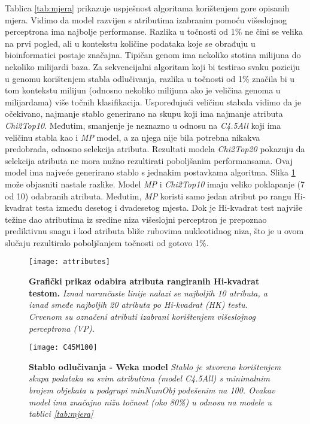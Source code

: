 Tablica \ref{tab:mjera} prikazuje uspješnost algoritama korištenjem gore opisanih mjera. Vidimo da model razvijen s atributima izabranim pomoću višeslojnog perceptrona ima najbolje performanse. Razlika u točnosti od 1\% ne čini se velika na prvi pogled, ali u kontekstu količine podataka koje se obrađuju u bioinformatici postaje značajna. Tipičan genom ima nekoliko stotina milijuna do nekoliko milijardi baza. Za sekvencijalni algoritam koji bi testirao svaku poziciju u genomu korištenjem stabla odlučivanja, razlika u točnosti od 1\% značila bi u tom kontekstu milijun (odnosno nekoliko milijuna ako je veličina genoma u milijardama) više točnih klasifikacija.
Uspoređujući veličinu stabala vidimo da je očekivano, najmanje stablo generirano na skupu koji ima najmanje atributa \textit{Chi2Top10}. Međutim, smanjenje je neznazno u odnosu na \textit{C4.5All} koji ima veličinu stabla kao i \textit{MP} model, a za njega nije bila potrebna nikakva predobrada, odnosno selekcija atributa. 
Rezultati modela \textit{Chi2Top20} pokazuju da selekcija atributa ne mora nužno rezultirati poboljšanim performansama. Ovaj model ima najveće generirano stablo s jednakim postavkama algoritma. Slika \ref{fig:attributes} može objasniti nastale razlike. Model \textit{MP} i \textit{Chi2Top10} imaju veliko poklapanje (7 od 10) odabranih atributa. Međutim, \textit{MP} koristi samo jedan atribut po rangu Hi-kvadrat testa između desetog i dvadesetog mjesta. Dok je Hi-kvadrat test najviše težine dao atributima iz sredine niza višeslojni perceptron je prepoznao prediktivnu snagu i kod atributa bliže rubovima nukleotidnog niza, što je u ovom slučaju rezultiralo poboljšanjem točnosti od gotovo 1\%.
\begin{figure}[!ht]
    \centering
    \texttt{[image: attributes]}
    \caption[Grafički prikaz odabira atributa]{\textbf{Grafički prikaz odabira atributa rangiranih Hi-kvadrat testom.}  \textit{Iznad narančaste linije nalazi se najboljih 10 atributa, a iznad smeđe najboljih 20 atributa po Hi-kvadrat (HK) testu. Crvenom su označeni atributi izabrani korištenjem višeslojnog perceptrona (VP).}}
    \label{fig:attributes}
\end{figure}
\begin{figure}[!ht]
    \centering
    \texttt{[image: C45M100]}
    \caption[Primjer modela stabla odlučivanja]{\textbf{Stablo odlučivanja - Weka model}  \textit{Stablo je stvoreno korištenjem skupa podataka sa svim atributima (model C4.5All) s minimalnim brojem objekata u podgrupi \textit{minNumObj} podešenim na 100. Ovakav model ima značajno nižu točnost (oko 80\%) u odnosu na modele u tablici \ref{tab:mjera}}}
    \label{fig:C45M100}
\end{figure}

